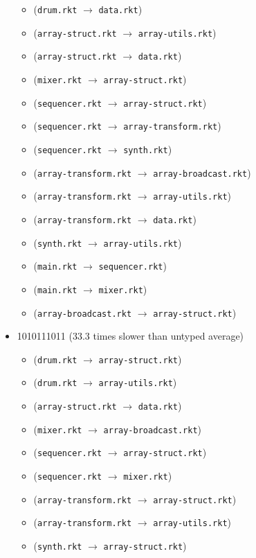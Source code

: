 \documentclass{article}
\newcommand{\mono}[1]{\texttt{#1}}
\begin{document}
\begin{itemize}
\begin{itemize}
  \item (\mono{drum.rkt} $\rightarrow$ \mono{data.rkt})
  \item (\mono{array-struct.rkt} $\rightarrow$ \mono{array-utils.rkt})
  \item (\mono{array-struct.rkt} $\rightarrow$ \mono{data.rkt})
  \item (\mono{mixer.rkt} $\rightarrow$ \mono{array-struct.rkt})
  \item (\mono{sequencer.rkt} $\rightarrow$ \mono{array-struct.rkt})
  \item (\mono{sequencer.rkt} $\rightarrow$ \mono{array-transform.rkt})
  \item (\mono{sequencer.rkt} $\rightarrow$ \mono{synth.rkt})
  \item (\mono{array-transform.rkt} $\rightarrow$ \mono{array-broadcast.rkt})
  \item (\mono{array-transform.rkt} $\rightarrow$ \mono{array-utils.rkt})
  \item (\mono{array-transform.rkt} $\rightarrow$ \mono{data.rkt})
  \item (\mono{synth.rkt} $\rightarrow$ \mono{array-utils.rkt})
  \item (\mono{main.rkt} $\rightarrow$ \mono{sequencer.rkt})
  \item (\mono{main.rkt} $\rightarrow$ \mono{mixer.rkt})
  \item (\mono{array-broadcast.rkt} $\rightarrow$ \mono{array-struct.rkt})
  \end{itemize}
\item 1010111011 (33.3 times slower than untyped average)
  \begin{itemize}
  \item (\mono{drum.rkt} $\rightarrow$ \mono{array-struct.rkt})
  \item (\mono{drum.rkt} $\rightarrow$ \mono{array-utils.rkt})
  \item (\mono{array-struct.rkt} $\rightarrow$ \mono{data.rkt})
  \item (\mono{mixer.rkt} $\rightarrow$ \mono{array-broadcast.rkt})
  \item (\mono{sequencer.rkt} $\rightarrow$ \mono{array-struct.rkt})
  \item (\mono{sequencer.rkt} $\rightarrow$ \mono{mixer.rkt})
  \item (\mono{array-transform.rkt} $\rightarrow$ \mono{array-struct.rkt})
  \item (\mono{array-transform.rkt} $\rightarrow$ \mono{array-utils.rkt})
  \item (\mono{synth.rkt} $\rightarrow$ \mono{array-struct.rkt})

\end{itemize}
\end{itemize}
\end{document}
